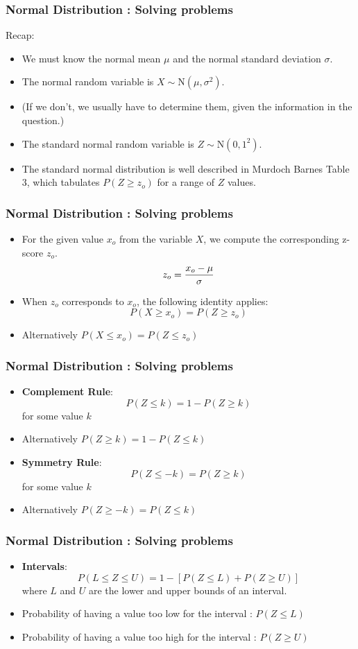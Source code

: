\begin{frame}
\frametitle{Normal Distribution : Solving problems}
Recap:
\begin{itemize}
\item We must know the normal mean $\mu$ and the normal standard deviation $\sigma$.
\item The normal random variable is $X \sim \mbox{N} ( \mu , \sigma^2)$.\smallskip
\item (If we don't, we usually have to determine them, given the information in the question.)\smallskip
\item The standard normal random variable is $Z\sim \mbox{N} ( 0 , 1^2)$.\smallskip
\item The standard normal distribution is well described in Murdoch Barnes Table 3, which tabulates $P(Z \geq z_o)$ for a range of $Z$ values.
\end{itemize}
\end{frame}
\begin{frame}
\frametitle{Normal Distribution : Solving problems}
\begin{itemize}
\item For the given value $x_o$ from the variable $X$, we compute the corresponding z-score $z_o$.
\[ z_o = { x_o - \mu \over \sigma} \]
\item When $z_o$ corresponds to $x_o$, the following identity applies:
\[  P(X \geq x_o )= P(Z \geq z_o ) \]
\item Alternatively $ P(X \leq x_o )= P(Z \leq z_o ) $
\end{itemize}
\end{frame}
\begin{frame}
\frametitle{Normal Distribution : Solving problems}
\begin{itemize}
\item \textbf{Complement Rule}: \[ P(Z \leq k) = 1-P(Z \geq k) \] for some value $k$
\item Alternatively $ P(Z \geq k) = 1-P(Z \leq k) $
\item \textbf{Symmetry Rule}: \[ P(Z \leq -k) = P(Z \geq k) \] for some value $k$
\item Alternatively $ P(Z \geq -k) = P(Z \leq k) $
\end{itemize}
\end{frame}
\begin{frame}
\frametitle{Normal Distribution : Solving problems}
\begin{itemize}

\item \textbf{Intervals}: \[ P(L \leq Z \leq U) = 1- [ P(Z \leq L) + P(Z \geq U)] \]
where $L$ and $U$ are the lower and upper bounds of an interval.
\item Probability of having a value too low for the interval : $P(Z \leq L)$
\item Probability of having a value too high for the interval : $P(Z \geq U)$
\end{itemize}
\end{frame}
